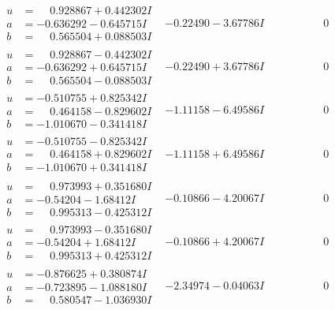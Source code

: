 \documentclass[1p]{elsarticle_modified}
\theoremstyle{definition}
\begin{document}
$$\begin{array}{c|c|c}
\begin{aligned}
u &= \phantom{-}0.928867 + 0.442302 I \\
a &= -0.636292 - 0.645715 I \\
b &= \phantom{-}0.565504 + 0.088503 I\end{aligned}
 & -0.22490 - 3.67786 I & \phantom{-0.000000 } 0 \\ \hline\begin{aligned}
u &= \phantom{-}0.928867 - 0.442302 I \\
a &= -0.636292 + 0.645715 I \\
b &= \phantom{-}0.565504 - 0.088503 I\end{aligned}
 & -0.22490 + 3.67786 I & \phantom{-0.000000 } 0 \\ \hline\begin{aligned}
u &= -0.510755 + 0.825342 I \\
a &= \phantom{-}0.464158 - 0.829602 I \\
b &= -1.010670 - 0.341418 I\end{aligned}
 & -1.11158 - 6.49586 I & \phantom{-0.000000 } 0 \\ \hline\begin{aligned}
u &= -0.510755 - 0.825342 I \\
a &= \phantom{-}0.464158 + 0.829602 I \\
b &= -1.010670 + 0.341418 I\end{aligned}
 & -1.11158 + 6.49586 I & \phantom{-0.000000 } 0 \\ \hline\begin{aligned}
u &= \phantom{-}0.973993 + 0.351680 I \\
a &= -0.54204 - 1.68412 I \\
b &= \phantom{-}0.995313 - 0.425312 I\end{aligned}
 & -0.10866 - 4.20067 I & \phantom{-0.000000 } 0 \\ \hline\begin{aligned}
u &= \phantom{-}0.973993 - 0.351680 I \\
a &= -0.54204 + 1.68412 I \\
b &= \phantom{-}0.995313 + 0.425312 I\end{aligned}
 & -0.10866 + 4.20067 I & \phantom{-0.000000 } 0 \\ \hline\begin{aligned}
u &= -0.876625 + 0.380874 I \\
a &= -0.723895 - 1.088180 I \\
b &= \phantom{-}0.580547 - 1.036930 I\end{aligned}
 & -2.34974 - 0.04063 I & \phantom{-0.000000 } 0 \\ \hline\begin{aligned}

\end{aligned}
\end{array}$$
\end{document}
